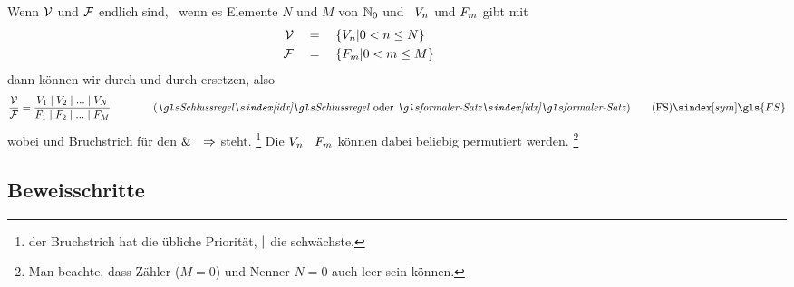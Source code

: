 Wenn $\prerequisiteset$ und $\conclusionset$ endlich sind, \textdh\ wenn es Elemente $N$ und $M$ von $\mathbb{N}_0$ und \Aussagen\ $V_n$ und $F_m$ gibt mit
\begin{align}
	\mathcal{V} & \quad = \quad \{V_n | 0 < n \le N \}
	\label{def:Voraussetzungen} \\
	\mathcal{F}     & \quad = \quad \{F_m     | 0 < m \le M \}
	\label{def:Folgerungen} &&&&&&&&&&
\end{align}
dann können wir \seqqt{$\prerequisiteset$} durch  und \seqqt{$\conclusionset$} durch  ersetzen, also \textzB\
\[
	\frac{\prerequisiteset}{\conclusionset} =
	\frac
		{\prerequisite_1 \srand \prerequisite_2 \srand ...\srand \prerequisite_N}
		{\conclusion_1     \srand \conclusion_2     \srand ...\srand \conclusion_M    }
	\qquad \qquad \text{(\emph{\glsIdx{Schlussregel}} oder \emph{\glsIdx{formaler-Satz}})}
	\tag{\tagFS} \sym{\gls{FS}} \label{def:formalerSatz}
\]
wobei \chrqt{$\srand$} und Bruchstrich für den  $\&$ \textbzw\ $\Rightarrow$ steht.%
\footnote{%
	der Bruchstrich hat die übliche Priorität, $\srand$ die schwächste.
}
Die $V_n$ \textbzw\ $F_m$ können dabei beliebig permutiert werden.%
\footnote{%
	Man beachte, dass Zähler ($M=0$) und Nenner $N=0$ auch leer sein können.
}

\subsection{Beweisschritte}%
\label{sub:Beweisschritte}

